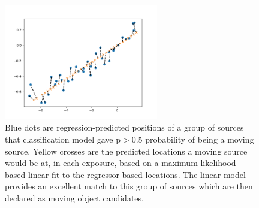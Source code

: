 \documentclass{aastex631}
\begin{document}
\begin{figure}[ht]
    \centering
    \includegraphics[width=0.6\textwidth,keepaspectratio]{Figures/diagnostic.png}
    \caption{Blue dots are regression-predicted positions of a group of sources that classification model gave p$>$0.5 probability of being a moving source. 
    Yellow crosses are the predicted locations a moving source would be at, in each exposure, based on a maximum likelihood-based linear fit to the regressor-based locations.
    The linear model provides an excellent match to this group of sources which are then declared as moving object candidates.
    }
    \label{fig:linking}
\end{figure}


\end{document}

